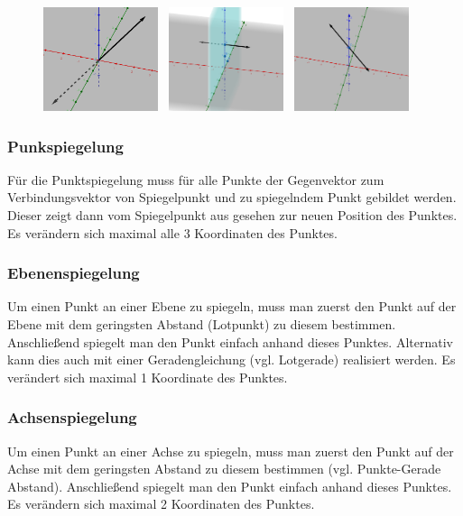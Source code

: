 \begin{figure}[H]
    \centering
    \includegraphics[width=0.3\textwidth]{images/3d-point-reflection.png} \,
    \includegraphics[width=0.3\textwidth]{images/3d-plane-reflection.png} \,
    \includegraphics[width=0.3\textwidth]{images/3d-axis-reflection.png}
\end{figure}

\subsubsection{Punkspiegelung}
Für die Punktspiegelung muss für alle Punkte der Gegenvektor zum  Verbindungsvektor von
Spiegelpunkt und zu spiegelndem Punkt gebildet werden. Dieser zeigt dann vom Spiegelpunkt
aus gesehen zur neuen Position des Punktes.
Es verändern sich maximal alle 3 Koordinaten des Punktes.

\subsubsection{Ebenenspiegelung}
Um einen Punkt an einer Ebene zu spiegeln, muss man zuerst den Punkt auf der
Ebene mit dem geringsten Abstand (Lotpunkt) zu diesem bestimmen. Anschließend
spiegelt man den Punkt einfach anhand dieses Punktes. Alternativ kann dies
auch mit einer Geradengleichung (vgl. Lotgerade) realisiert werden.
Es verändert sich maximal 1 Koordinate des Punktes.

\subsubsection{Achsenspiegelung}
Um einen Punkt an einer Achse zu spiegeln, muss man zuerst den Punkt auf der
Achse mit dem geringsten Abstand zu diesem bestimmen (vgl. Punkte-Gerade Abstand).
Anschließend spiegelt man den Punkt einfach anhand dieses Punktes.
Es verändern sich maximal 2 Koordinaten des Punktes.
